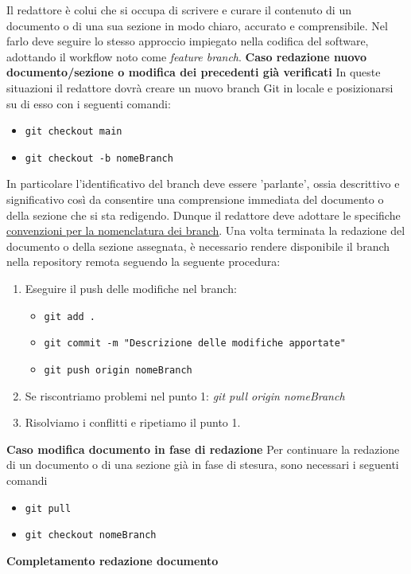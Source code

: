 Il redattore è colui che si occupa di scrivere e curare il contenuto di un documento o di una sua sezione in modo chiaro, accurato e comprensibile.
Nel farlo deve seguire lo stesso approccio impiegato nella codifica del software, adottando il
workflow noto come \textit{feature branch}.
\textbf{Caso redazione nuovo documento/sezione o modifica dei precedenti già verificati}
In queste situazioni il redattore dovrà creare un nuovo branch Git in locale e posizionarsi su di esso con i seguenti comandi:
\begin{itemize}
	\item \texttt{git checkout main}
	\item \texttt{git checkout -b nomeBranch}
\end{itemize}
In particolare l'identificativo del branch deve essere 'parlante', ossia descrittivo e significativo così da consentire una comprensione immediata
del documento o della sezione che si sta redigendo. Dunque il redattore deve adottare le specifiche
\href{#convenzioni_nomenclatura}{\underline{convenzioni per la nomenclatura dei branch}}.
Una volta terminata la redazione del documento o della sezione assegnata, è necessario rendere disponibile il branch
nella repository remota seguendo la seguente procedura:
\begin{enumerate}
	\item Eseguire il push delle modifiche nel branch:
	      \begin{itemize}
		      \item \texttt{git add .}
		      \item \texttt{git commit -m "Descrizione delle modifiche apportate"}
		      \item \texttt{git push origin nomeBranch}
	      \end{itemize}
	\item Se riscontriamo problemi nel punto 1:
	      \textit{git pull origin nomeBranch}
	\item Risolviamo i conflitti e ripetiamo il punto 1.
\end{enumerate}
\textbf{Caso modifica documento in fase di redazione}
Per continuare la redazione di un documento o di una sezione già in fase di stesura, sono necessari i seguenti comandi
\begin{itemize}
	\item \texttt{git pull}
	\item \texttt{git checkout nomeBranch}
\end{itemize}
\textbf{Completamento redazione documento}
